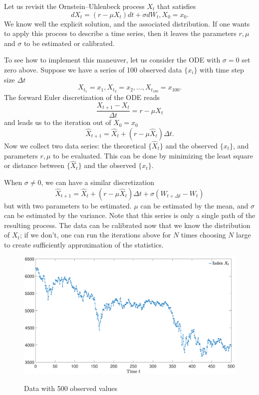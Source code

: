     \problem
    \begin{question}
        Let us revisit the Ornstein--Uhlenbeck process $X_t$ that satisfies
        \begin{equation}\label{OU}
        dX_t=(r-\mu X_t)dt+\sigma dW_t,X_0=x_0.
        \end{equation}
        We know well the explicit solution, and the associated distribution.  If one wants to apply this process to describe a time series, then it leaves the parameters $r,\mu$ and $\sigma$ to be estimated or calibrated.

        To see how to implement this maneuver, let us consider the ODE with $\sigma=0$ set zero above.  Suppose we have a series of 100 observed data $\{x_i\}$ with time step size $\Delta t$
        \[X_{t_1}=x_1,X_{t_2}=x_2,...,X_{t_{100}}=x_{100}.\]
        The forward Euler discretization of the ODE reads
        \[\frac{X_{t+1}-X_{t}}{\Delta t}=r-\mu X_{t}\]
        and leads us to the iteration out of $X_0=x_0$
        \[\hat X_{t+1}=\hat X_{t}+(r-\mu \hat X_{t})\Delta t.\]
        Now we collect two data series: the theoretical $\{\hat X_t\}$ and the observed $\{x_{t}\}$, and parameters $r,\mu$ to be evaluated.  This can be done by minimizing the least square or distance between $\{\hat X_t\}$ and the observed $\{x_{t}\}$.

        When $\sigma\neq0$, we can have a similar discretization
        \[\hat X_{t+1}=\hat X_{t}+(r-\mu \hat X_{t})\Delta t+\sigma (W_{t+\Delta t}-W_t)\]
        but with two parameters to be estimated.  $\mu$ can be estimated by the mean, and $\sigma$ can be estimated by the variance.  Note that this series is only a single path of the resulting process.  The data can be calibrated now that we know the distribution of $X_t$; if we don't, one can run the iterations above for $N$ times choosing $N$ large to create sufficiently approximation of the statistics.
        \begin{figure}[h!]
        \centering
        \includegraphics[width=1\textwidth]{data.eps}\\
        \caption{Data with 500 observed values}\label{data}
        \end{figure}


\end{question}
